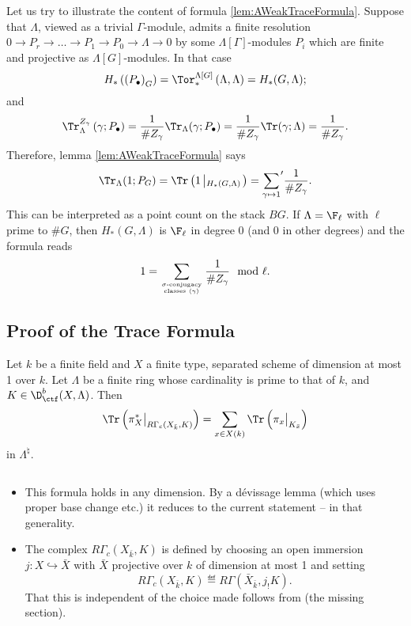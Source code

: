 Let us try to illustrate the content of formula \ref{lem:AWeakTraceFormula}. Suppose that $\Lambda$, viewed as a trivial $\Gamma$-module, admits a finite resolution 
$
0\to P_r\to \ldots \to P_1 \to P_0\to \Lambda\to 0
$
by some $\Lambda[\Gamma]$-modules $P_i$ which are finite and projective as $\Lambda[G]$-modules. In that case
$$ 
H_*\left(\left(P_\bullet\right)_G\right) = \Tor_*^{\Lambda[G]}\left(\Lambda, \Lambda\right) = H_*(G, \Lambda) ; 
$$
and
$$
\Tr_\Lambda^{Z_\gamma}\left(\gamma; P_\bullet\right) =\frac{1}{\# Z_\gamma}\Tr_\Lambda(\gamma; P_\bullet)=\frac{1}{\# Z_\gamma}\Tr(\gamma;\Lambda) = \frac{1}{\# Z_\gamma}.
$$
Therefore, lemma \ref{lem:AWeakTraceFormula} says
$$
\Tr_\Lambda (1 ; P_G) 
= \Tr\left(1\left|_{H_*(G, \Lambda)}\right.\right) 
= {\sum_{\gamma\mapsto1}}'\frac{1}{\# Z_\gamma}.
$$
This can be interpreted as a point count on the stack $BG$. If $\Lambda= \F_\ell$ with $\ell$ prime to $\#G$, then $H_*(G, \Lambda)$ is $\F_\ell$ in degree 0 (and 0 in other degrees) and the formula reads 
$$
1 = \sum_{\sigma\text{-conjugacy}\atop \text{classes }\left<\gamma\right>}\frac{1}{\# Z_\gamma}\mod{\ell}.
$$


\subsection{Proof of the Trace Formula}

\begin{thm} \label{thm:SomeTraceFormulaInDim1}
Let $k$ be a finite field and $X$ a finite type, separated scheme of dimension at most 1 over $k$. Let $\Lambda$ be a finite ring whose cardinality is prime to that of $k$, and $K\in \D_{\ctf}^b(X, \Lambda)$. Then
\begin{equation} \label{eq:SomeTraceFormulaInDim1}
\Tr\left(\pi_X^*\big|_{R\Gamma_c(X_{\bar k}, K)}\right) = \sum_{x\in X(k)} \Tr\left(\pi_x\big|_{K_{\bar x}}\right)
\end{equation}
in $\Lambda^{\natural}$. 
\end{thm}

\begin{remark} $ $
\begin{itemize}
\item 
This formula holds in any dimension. By a d\'evissage lemma (which uses proper base change etc.) it reduces to the current statement -- in that generality.
\item 
The complex $R\Gamma_c(X_{\bar k}, K)$ is defined by choosing an open immersion $j: X \hookrightarrow \bar X$ with $\bar X$ projective over $k$ of dimension at most 1 and setting
$$
R\Gamma_c(X_{\bar k}, K) \eqdef R\Gamma(\bar X_{\bar k}, j_!K).
$$
That this is independent of the choice made follows from (the missing section).
\end{itemize}
\end{remark}

